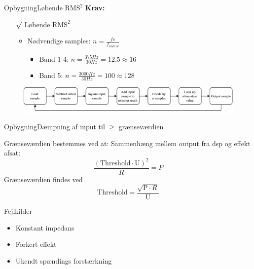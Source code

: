 \begin{frame}{Opbygning}{Løbende $\text{RMS}^2$}
\textbf{Krav:}
\begin{itemize}
\item[$\surd$] Løbende $\text{RMS}^2$
\begin{itemize}
\item Nødvendige samples: $n = \frac{fs}{f_{lowest}}$
\begin{itemize}
\item Band 1-4: $n = \frac{375 Hz}{30 Hz} = 12.5 \approx 16$
\item Band 5: $n = \frac{3000 Hz}{30 Hz} = 100 \approx 128$
\end{itemize}
\end{itemize}
\end{itemize}
\begin{figure}
\includegraphics[width=1\textwidth]{Compressor}
\end{figure} 
\end{frame}


\begin{frame}{Opbygning}{Dæmpning af input til $\geq$ grænseværdien}
\begin{block}{Grænseværdien bestemmes ved at:}
Sammenhæng mellem output fra dsp og effekt afsat:\\
$$ \frac{(\text{Threshold} \cdot \text{U})^2}{R} = P $$
Grænseværdien findes ved $$\text{Threshold} = \frac{\sqrt{\text{P} \cdot R}}{\text{U}}$$
\end{block}

\begin{block}{\alert{Fejlkilder}}
\begin{itemize}
	\item Konstant impedans
	\item Forkert effekt
	\item Ukendt spændings forstærkning
\end{itemize}
\end{block}

%

\end{frame}

